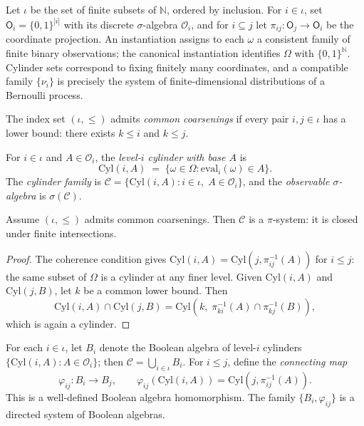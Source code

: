 \begin{example}
\label{ex:bernoulli}
Let $\iota$ be the set of finite subsets of $\mathbb{N}$, ordered by inclusion. For $i \in \iota$, set $\mathsf{O}_i = \{0,1\}^{|i|}$ with its discrete $\sigma$-algebra $\mathcal{O}_i$, and for $i \subseteq j$ let $\pi_{ij} : \mathsf{O}_j \to \mathsf{O}_i$ be the coordinate projection. An instantiation assigns to each $\omega$ a consistent family of finite binary observations; the canonical instantiation identifies $\Omega$ with $\{0,1\}^{\mathbb{N}}$.  Cylinder sets correspond to fixing finitely many coordinates, and a compatible family $\{\nu_i\}$ is precisely the system of finite-dimensional distributions of a Bernoulli process.
\end{example}

\begin{definition}
The index set $(\iota, \leq)$ admits \emph{common coarsenings} if every pair $i, j \in \iota$ has a lower bound: there exists $k \leq i$ and $k \leq j$.
\end{definition}

\begin{definition}
\label{def:cylinder}
For $i \in \iota$ and $A \in \mathcal{O}_i$, the \emph{level-$i$ cylinder with base $A$} is
\[
  \mathrm{Cyl}(i, A)
  \;=\; \{\omega \in \Omega : \mathrm{eval}_i(\omega) \in A\}.
\]
The \emph{cylinder family} is $\mathcal{C} = \{\mathrm{Cyl}(i, A) : i \in \iota,\; A \in \mathcal{O}_i\}$, and the \emph{observable $\sigma$-algebra} is $\sigma(\mathcal{C})$.
\end{definition}

\begin{lemma}
\label{lem:pi-system}
Assume $(\iota, \leq)$ admits common coarsenings.  Then $\mathcal{C}$ is a $\pi$-system: it is closed under finite intersections.
\end{lemma}

\begin{proof}
The coherence condition gives $\mathrm{Cyl}(i, A) = \mathrm{Cyl}(j, \pi_{ij}^{-1}(A))$ for $i \leq j$: the same subset of $\Omega$ is a cylinder at any finer level. Given $\mathrm{Cyl}(i, A)$ and $\mathrm{Cyl}(j, B)$, let $k$ be a common lower bound.  Then
\[
  \mathrm{Cyl}(i, A) \cap \mathrm{Cyl}(j, B)
  = \mathrm{Cyl}(k,\; \pi_{ki}^{-1}(A) \cap \pi_{kj}^{-1}(B)),
\]
which is again a cylinder.
\end{proof}

For each $i \in \iota$, let $B_i$ denote the Boolean algebra of level-$i$ cylinders $\{\mathrm{Cyl}(i, A) : A \in \mathcal{O}_i\}$; then $\mathcal{C} = \bigcup_{i \in \iota} B_i$. For $i \leq j$, define the \emph{connecting map}
\[
  \varphi_{ij} : B_i \to B_j,
  \qquad
  \varphi_{ij}(\mathrm{Cyl}(i, A)) = \mathrm{Cyl}(j, \pi_{ij}^{-1}(A)).
\]
This is a well-defined Boolean algebra homomorphism.  The family $\{B_i, \varphi_{ij}\}$ is a directed system of Boolean algebras.

